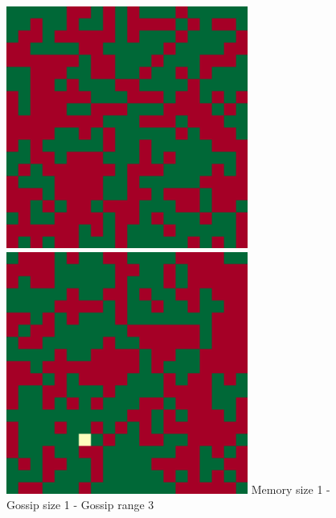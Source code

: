 \documentclass[english]{article}
\begin{document}
\begin{figure}[!h]
{    \includegraphics[width=\textwidth/3]{spatial-memory5+gossip0+range0-B.pdf}
    \includegraphics[width=\textwidth/3]{spatial-memory5+gossip0+range0-C.pdf}
  }
  Memory size 1 - Gossip size 1 - Gossip range 3

\end{figure}
\end{document}
